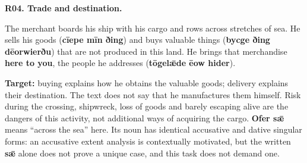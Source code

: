 \par\begin{minipage}{\linewidth}\raggedright
\textbf{R04. Trade and destination.}

The merchant boards his ship with his cargo and rows across stretches of sea. He sells his goods (\textbf{cīepe mīn ðing}) and buys valuable things (\textbf{bycge ðing dēorwierðu}) that are not produced in this land. He brings that merchandise \textbf{here to you}, the people he addresses (\textbf{tōgelǣde ēow hider}).

\textbf{Target:} buying explains how he obtains the valuable goods; delivery explains their destination. The text does not say that he manufactures them himself. Risk during the crossing, shipwreck, loss of goods and barely escaping alive are the dangers of this activity, not additional ways of acquiring the cargo. \textbf{Ofer sǣ} means “across the sea” here. Its noun has identical accusative and dative singular forms: an accusative extent analysis is contextually motivated, but the written \textbf{sǣ} alone does not prove a unique case, and this task does not demand one.

\end{minipage}\par\addvspace{4pt}

